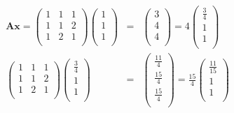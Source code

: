 \documentclass[a4j,twoside,openright,11pt]{jsarticle}
\begin{document}
\begin{eqnarray}
\bm{Ax}=
  \left(
    \begin{array}{rrr}
      1 & 1 & 1 \\
      1 & 1 & 2 \\
      1 & 2 & 1 \\
    \end{array}
  \right)
  \left(
    \begin{array}{r}
      1 \\
      1 \\
      1 \\
    \end{array}
  \right)&=&
  \left(
    \begin{array}{r}
      3 \\
      4 \\
      4 \\
    \end{array}
  \right)=4
  \left(
    \begin{array}{r}
      \frac{3}{4} \\
      1 \\
      1 \\
    \end{array}
  \right)
\nonumber\\
  \left(
    \begin{array}{rrr}
      1 & 1 & 1 \\
      1 & 1 & 2 \\
      1 & 2 & 1 \\
    \end{array}
  \right)
  \left(
    \begin{array}{r}
      \frac{3}{4} \\
      1 \\
      1 \\
    \end{array}
  \right)&=&
  \left(
    \begin{array}{r}
      \frac{11}{4} \\
      \frac{15}{4} \\
      \frac{15}{4} \\
    \end{array}
  \right)=\frac{15}{4}
  \left(
    \begin{array}{r}
      \frac{11}{15} \\
      1 \\
      1 \\
    \end{array}
  \right)
\nonumber
\\

\end{eqnarray}
\end{document}
